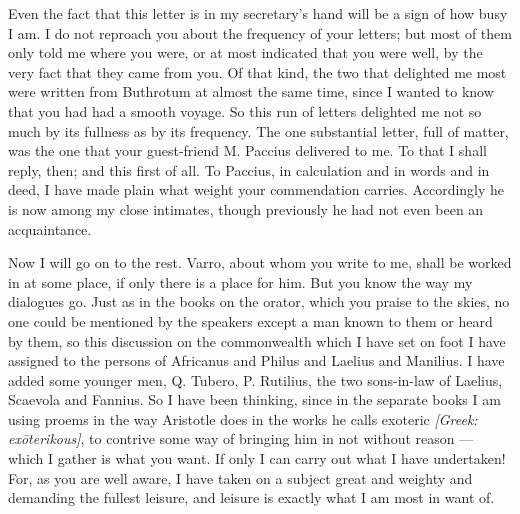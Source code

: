 

 Even the fact that this letter is in my secretary's hand will be a sign of how busy I am. I do not reproach you about the frequency of your letters; but most of them only told me where you were, or at most indicated that you were well, by the very fact that they came from you. Of that kind, the two that delighted me most were written from Buthrotum at almost the same time, since I wanted to know that you had had a smooth voyage. So this run of letters delighted me not so much by its fullness as by its frequency. The one substantial letter, full of matter, was the one that your guest-friend M. Paccius delivered to me. To that I shall reply, then; and this first of all. To Paccius, in calculation and in words and in deed, I have made plain what weight your commendation carries. Accordingly he is now among my close intimates, though previously he had not even been an acquaintance.

 Now I will go on to the rest. Varro, about whom you write to me, shall be worked in at some place, if only there is a place for him. But you know the way my dialogues go. Just as in the books on the orator, which you praise to the skies, no one could be mentioned by the speakers except a man known to them or heard by them, so this discussion on the commonwealth which I have set on foot I have assigned to the persons of Africanus and Philus and Laelius and Manilius. I have added some younger men, Q. Tubero, P. Rutilius, the two sons-in-law of Laelius, Scaevola and Fannius. So I have been thinking, since in the separate books I am using proems in the way Aristotle does in the works he calls exoteric \textit{[Greek: ex\=oterikous]}, to contrive some way of bringing him in not without reason --- which I gather is what you want. If only I can carry out what I have undertaken! For, as you are well aware, I have taken on a subject great and weighty and demanding the fullest leisure, and leisure is exactly what I am most in want of.

